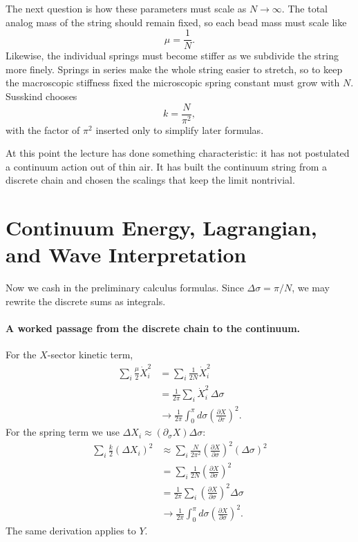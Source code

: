 The next question is how these parameters must scale as \(N\to\infty\). The total analog mass of the string should remain fixed, so each bead mass must scale like
\begin{equation}
\mu=\frac{1}{N}.
\end{equation}
Likewise, the individual springs must become stiffer as we subdivide the string more finely. Springs in series make the whole string easier to stretch, so to keep the macroscopic stiffness fixed the microscopic spring constant must grow with \(N\). Susskind chooses
\begin{equation}
k=\frac{N}{\pi^2},
\end{equation}
with the factor of \(\pi^2\) inserted only to simplify later formulas.

At this point the lecture has done something characteristic: it has not postulated a continuum action out of thin air. It has built the continuum string from a discrete chain and chosen the scalings that keep the limit nontrivial.

\section{Continuum Energy, Lagrangian, and Wave Interpretation}

Now we cash in the preliminary calculus formulas. Since \(\Delta \sigma=\pi/N\), we may rewrite the discrete sums as integrals.

\paragraph{A worked passage from the discrete chain to the continuum.}
For the \(X\)-sector kinetic term,
\begin{align}
\sum_i \frac{\mu}{2}\dot X_i^2
&=
\sum_i \frac{1}{2N}\dot X_i^2 \\
&=
\frac{1}{2\pi}\sum_i \dot X_i^2\,\Delta \sigma \\
&\longrightarrow
\frac{1}{2\pi}\int_0^\pi d\sigma
\left(\frac{\partial X}{\partial \tau}\right)^2 .
\end{align}
For the spring term we use \(\Delta X_i\approx (\partial_\sigma X)\Delta \sigma\):
\begin{align}
\sum_i \frac{k}{2}(\Delta X_i)^2
&\approx
\sum_i \frac{N}{2\pi^2}
\left(\frac{\partial X}{\partial \sigma}\right)^2
(\Delta \sigma)^2 \\
&=
\sum_i \frac{1}{2N}
\left(\frac{\partial X}{\partial \sigma}\right)^2 \\
&=
\frac{1}{2\pi}\sum_i
\left(\frac{\partial X}{\partial \sigma}\right)^2\Delta \sigma \\
&\longrightarrow
\frac{1}{2\pi}\int_0^\pi d\sigma
\left(\frac{\partial X}{\partial \sigma}\right)^2 .
\end{align}
The same derivation applies to \(Y\).

